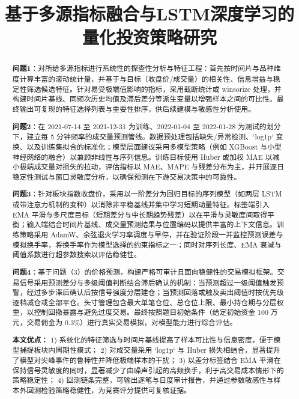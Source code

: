 \documentclass[withoutpreface,bwprint]{cumcmthesis}
\title{基于多源指标融合与LSTM深度学习的量化投资策略研究}
\begin{document}
\maketitle
\thispagestyle{empty}
\begin{abstract}\setlength{\parskip}{0.3\baselineskip}

\textbf{问题1}：对所给多源指标进行系统性的探查性分析与特征工程：首先按时间片与品种维度计算丰富的滚动统计量，并基于与目标（收盘价/成交量）的相关性、信息增益与稳定性筛选候选特征。针对易受极端值影响的指标，采用截断统计或 winsorize 处理，并构建时间片基线、同频次历史均值及滞后差分等派生变量以增强样本之间的可比性。最终输出可复现的特征选择列表与重要性排序，供后续建模与敏感性分析使用。

\textbf{问题2}：在 2021-07-14 至 2021-12-31 为训练、2022-01-04 至 2022-01-28 为测试的划分下，建立每 5 分钟频率的成交量预测管线。数据预处理包括缺失/异常检测、`log1p` 变换、以及训练集拟合的标准化；模型层面建议采用多模型策略（例如 XGBoost 与小型神经网络的融合）以兼顾非线性与序列信息。训练目标使用 Huber 或加权 MAE 以减小极端成交量对损失的拉动，评估指标以 MAE、MAPE 与残差分布为主，并开展逐日稳定性测试与窗口灵敏度分析，以确保预测在下游交易决策中的可靠性。

\textbf{问题3}：针对板块指数收盘价，采用以一阶差分为回归目标的序列模型（如两层 LSTM 或带注意力机制的变种）以消除非平稳基线并集中学习短期动量特征。标签端引入 EMA 平滑与多尺度目标（短期差分与中长期趋势残差）以在平滑与灵敏度间取得平衡；输入端结合时间片基线、成交量预测结果与位置编码以提供丰富的上下文信息。训练策略采用 AdamW、余弦退火学习率调度与早停，并在验证阶段一并监控预测误差与模拟换手率，将换手率作为模型选择的约束指标之一；同时对序列长度、EMA 衰减与阈值系数进行超参数搜索以评估稳健性。

\textbf{问题4}：基于问题（3）的价格预测，构建严格可审计且面向稳健性的交易模拟框架。交易信号采用预测差分与多级阈值判断结合滞后确认的机制：当预测超过一级阈值触发预警，经过多步滞后确认后按信号强度分层建仓；当预测回落或触及卖出阈值时按优先级逐档减仓或全部平仓。头寸管理包含最大单笔仓位、总仓位上限、最小持仓期与分层权重，以控制回撤暴露与避免过度交易。最终按照题目初始条件（给定初始资金 100 万元，交易佣金为 0.3\%）进行真实交易模拟，对模型能力进行综合评估。

\textbf{本文优点：}
1) 系统化的特征筛选与时间片基线提高了样本可比性与信息密度，便于模型捕捉板块内周期性模式；
2) 对成交量采用 `log1p` 与 Huber 损失相结合，显著提升了模型对尖峰事件的鲁棒性并降低极端样本的干扰；
3) 以差分标签结合 EMA 平滑在保持信号灵敏度的同时，显著减少了由噪声引起的高频换手，利于高交易成本情形下的策略稳定性；
4) 回测链条完整，可输出逐笔与日度审计报告，并通过参数敏感性与样本外回测检验策略稳健性，为竞赛评分提供可复核证据。

\end{abstract}
\thispagestyle{empty}
\tableofcontents
\thispagestyle{empty}
\newpage
\setcounter{page}{1} 
\end{document}
